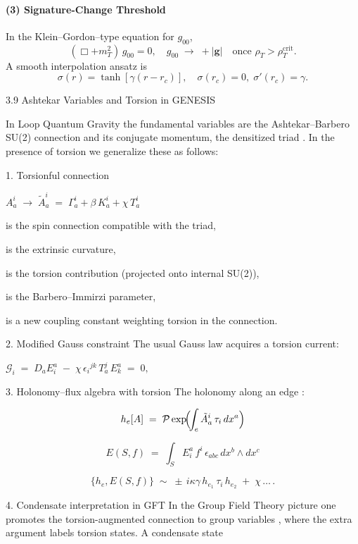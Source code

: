 \documentclass{article}
\begin{document}
\paragraph{(3) Signature-Change Threshold}
In the Klein–Gordon–type equation for $g_{00}$,
\[
  (\Box + m_T^2)\,g_{00}=0,
  \quad
  g_{00}\;\to\;+|\mathbf{g}|\quad\text{once }\rho_T>\rho_T^{\mathrm{crit}}.
\]
A smooth interpolation ansatz is
\[
  \sigma(r)=\tanh[\gamma(r-r_c)], 
  \quad
  \sigma(r_c)=0,\;\sigma'(r_c)=\gamma.
\]


3.9 Ashtekar Variables and Torsion in GENESIS

In Loop Quantum Gravity the fundamental variables are the Ashtekar–Barbero SU(2) connection  and its conjugate momentum, the densitized triad .  In the presence of torsion we generalize these as follows:

1. Torsionful connection



$A^i_a \;\longrightarrow\; \tilde A^i_a \;=\; \Gamma^i_a + \beta\,K^i_a + \chi\,T^i_a$

 is the spin connection compatible with the triad,

 is the extrinsic curvature,

 is the torsion contribution (projected onto internal SU(2)),

 is the Barbero–Immirzi parameter,

 is a new coupling constant weighting torsion in the connection.


2. Modified Gauss constraint
The usual Gauss law  acquires a torsion current:



$\mathcal{G}_i \;=\; D_a E^a_i \;-\; \chi\,\epsilon_{i}{}^{jk}\,T^j_a\,E^a_k \;=\; 0,$

3. Holonomy–flux algebra with torsion
The holonomy along an edge :



\[ h_e[A] \;=\; \mathcal P\exp\!\Bigl(\!\int_e \tilde A^i_a\,\tau_i\,dx^a\Bigr) \]

\[ E(S,f) \;=\; \int_S E_i^a\,f^i\,\epsilon_{abc}\,dx^b\wedge dx^c \]

\[
  \{h_e, E(S,f)\}
  \;\sim\;
  \pm\,i\kappa\gamma\,
  h_{e_1}\,\tau_i\,h_{e_2}
  \;+\;
  \chi\,\ldots\,.
\]

4. Condensate interpretation in GFT
In the Group Field Theory picture one promotes the torsion-augmented connection  to group variables , where the extra argument  labels torsion states.  A condensate state
\end{document}
